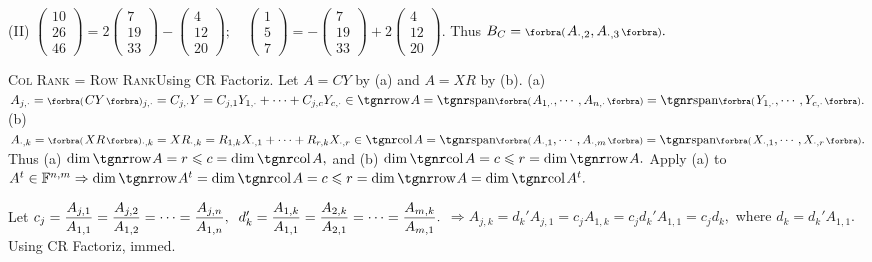 (II) {\small$\begin{pmatrix} 10\\[-2pt] 26\\[-2pt] 46\end{pmatrix}=2\begin{pmatrix} 7\\[-2pt] 19\\[-2pt] 33\end{pmatrix}-\begin{pmatrix} 4\\[-2pt] 12\\[-2pt] 20\end{pmatrix}; \quad \begin{pmatrix} 1\\[-2pt] 5\\[-2pt] 7\end{pmatrix}=-\begin{pmatrix} 7\\[-2pt] 19\\[-2pt] 33\end{pmatrix}+2\begin{pmatrix} 4\\[-2pt] 12\\[-2pt] 20\end{pmatrix}$}. \;Thus $B_C=\BigPar{A_{\cdot,2},A_{\cdot,3}}.$\vspace{10pt}\par
\SepLine

\BulletPointX\textsc{Col Rank = Row Rank}\quad Using CR Factoriz. Let $A=CY$ by (a) and $A=XR$ by (b).\TextB{}
(a) $A_{j,\cdot}=\BigPar{CY}{_{j,\cdot}}=C_{j,\cdot}Y=C_{j,1}Y_{1,\cdot}+\dots+C_{j,c}Y_{c,\cdot}\in\row A=\Span[\BigPar]{A_{1,\cdot},\cdots,A_{n,\cdot}}=\Span[\BigPar]{Y_{1,\cdot},\cdots,Y_{c,\cdot}}.$\TextB{}
(b) $A_{\cdot,k}=\BigPar{XR}{_{\cdot,k}}=XR_{\cdot,k}=R_{1,k}X_{\cdot,1}+\dots+R_{r,k}X_{\cdot,r}\in\col A=\Span[\BigPar]{A_{\cdot,1},\cdots,A_{\cdot,m}}=\Span[\BigPar]{X_{\cdot,1},\cdots,X_{\cdot,r}}.$\TextB{}
Thus (a) $\dim\row A=r\leqslant c=\dim\col A,$ and (b) $\dim\col A=c\leqslant r=\dim\row A.$\vspace{2pt}\PfEnd\TextB{}
\Or Apply (a) to $A^t\in\Fbb^{n,m}\Rightarrow\dim\row A^t=\dim\col A=c\leqslant r=\dim\row A=\dim\col A^t.$\PfEnd
\SepLine

Let $c_j={\displaystyle{\frac{A_{j,1}}{A_{1,1}}}}={\displaystyle{\frac{A_{j,2}}{A_{1,2}}}}=\dots={\displaystyle{\frac{A_{j,n}}{A_{1,n}}}},\;\;d_k'={\displaystyle{\frac{A_{1,k}}{A_{1,1}}}}={\displaystyle{\frac{A_{2,k}}{A_{2,1}}}}=\dots={\displaystyle{\frac{A_{m,k}}{A_{m,1}}}}.$\vspace{4pt}\parSol{}
{$\Rightarrow A_{j,k}=d_k' A_{j,1}=c_j A_{1,k}=c_j d_k' A_{1,1}=c_j d_k,$ where $d_k=d_k' A_{1,1}.$}\quad\Or Using CR Factoriz, immed.\PfEnd
\SepLine

